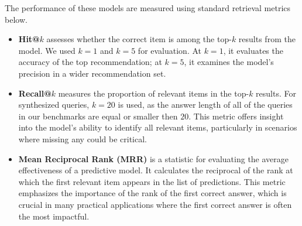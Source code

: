 The performance of these models are measured using standard retrieval metrics below.




\vspace{-5pt}
\begin{itemize}[leftmargin=*]

    \vspace{-1pt}   
    \item \textbf{Hit@$k$} assesses whether the correct item is among the top-$k$ results from the model. We used $k=1$ and $k=5$ for evaluation. At $k=1$, it evaluates the accuracy of the top recommendation; at $k=5$, it examines the model's precision in a wider recommendation set.  

    \vspace{-1pt}   
    \item \textbf{Recall@$k$} measures the proportion of relevant items in the top-$k$ results. For synthesized queries, $k=20$ is used, as the answer length of all of the queries in our benchmarks are equal or smaller then $20$. 
    This metric offers insight into the model's ability to identify all relevant items, particularly in scenarios where missing any could be critical. 

    \vspace{-1pt}   
    \item \textbf{Mean Reciprocal Rank (MRR)} is a statistic for evaluating the average effectiveness of a predictive model. It calculates the reciprocal of the rank at which the first relevant item appears in the list of predictions. 
    This metric emphasizes the importance of the rank of the first correct answer, which is crucial in many practical applications where the first correct answer is often the most impactful.
\end{itemize}

